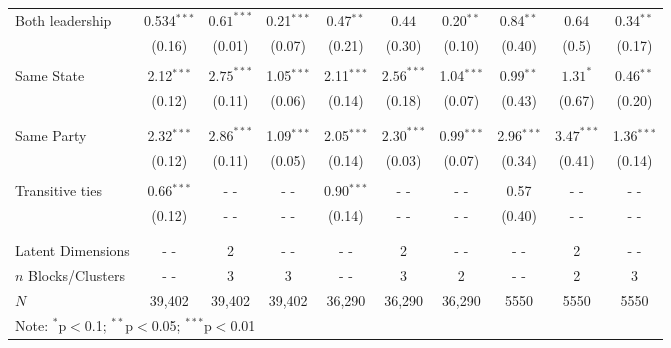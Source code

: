 \documentclass[fleqn,12pt]{wlscirep}
\begin{document}
\begin{landscape}
\begin{table}[!htbp]
\begin{tabular}{lccccccccc}
Both leadership & 0.534$^{***}$ &  $0.61^{***}$     &0.21$^{***}$ &    
0.47$^{**}$ &   $0.44$   &0.20$^{**}$ & 
0.84$^{**}$ & $0.64$&0.34$^{**}$ \\ 
  & (0.16) & (0.01)&  (0.07) & 
  (0.21) & (0.30)& (0.10)  &
  (0.40)   & (0.5)& (0.17)
    \\ 
  & & & \\ 
Same State & 2.12$^{***}$ &$2.75^{***}$& 1.05$^{***}$ &
2.11$^{***}$ &$2.56^{***}$ &1.04$^{***}$ & 
0.99$^{**}$ &$1.31^{*}$& 0.46$^{**}$\\ 
  & (0.12) &(0.11)& (0.06) &
  (0.14) &(0.18)& (0.07) &
  (0.43) &(0.67)& (0.20)\\ 
      \\ 
  & & & \\ 
Same Party & 2.32$^{***}$ &$2.86^{***}$ & 1.09$^{***}$ & 
2.05$^{***}$ &$2.30^{***}$& 0.99$^{***}$&
2.96$^{***}$ &$3.47^{***}$&1.36$^{***}$\\ 
  & (0.12) &(0.11)& (0.05) &
   (0.14) &(0.03)& (0.07)&
   (0.34) &(0.41)& (0.14) \\
  & & & \\ 
 Transitive ties & 0.66$^{***}$ &- - &- -& 0.90$^{***}$ &- -&- -&0.57&- -& - -\\ 
  & (0.12) &- - &- -& (0.14) &- - &- -& (0.40)&- - &- - \\ 
  & & & \\ 
\hline \\[-1.8ex] 
Latent Dimensions & - - & 2 & - - & - - & 2 & - - & - - & 2 &- -\\
$n$ Blocks/Clusters & - - & 3 & 3 & - - & 3 & 2 & - - & 2 & 3\\
$N$ & 39,402  & 39,402 &  39,402 &36,290 &36,290 &  36,290 &5550& 5550&  5550\\  
\hline
\multicolumn{4}{l}{\scriptsize{Note: {$^{*}$p$<$0.1; $^{**}$p$<$0.05; $^{***}$p$<$0.01}}}
\end{tabular}
\end{table}
\end{landscape}
\end{document}
